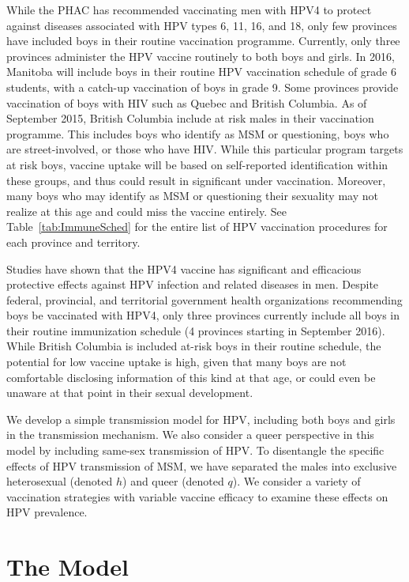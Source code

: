 \documentclass[12pt]{article}
\begin{document}
While the PHAC has recommended vaccinating men with HPV4 to protect against diseases associated with HPV types 6, 11, 16, and 18, only few provinces have included boys in their routine vaccination programme.  Currently, only three provinces administer the HPV vaccine routinely to both boys and girls.  In 2016, Manitoba will include boys in their routine HPV vaccination schedule of grade 6 students, with a catch-up vaccination of boys in grade 9.  Some provinces provide vaccination of boys with HIV such as Quebec and British Columbia.  As of September 2015, British Columbia include at risk males in their vaccination programme.  This includes boys who identify as MSM or questioning, boys who are street-involved, or those who have HIV. While this particular program targets at risk boys, vaccine uptake will be based on self-reported identification within these groups, and thus could result in significant under vaccination.  Moreover, many boys who may identify as MSM or questioning their sexuality may not realize at this age and could miss the vaccine entirely.  See Table~\ref{tab:ImmuneSched} for the entire list of HPV vaccination procedures for each province and territory.  

Studies have shown that the HPV4 vaccine has significant and efficacious protective effects against HPV infection and related diseases in men.  Despite federal, provincial, and territorial government health organizations recommending boys be vaccinated with HPV4, only three provinces currently include all boys in their routine immunization schedule (4 provinces starting in September 2016).  While British Columbia is included at-risk boys in their routine schedule, the potential for low vaccine uptake is high, given that many boys are not comfortable disclosing information of this kind at that age, or could even be unaware at that point in their sexual development.  

We develop a simple transmission model for HPV, including both boys and girls in the transmission mechanism.  We also consider a queer perspective in this model by including same-sex transmission of HPV.  To disentangle the specific effects of HPV transmission of MSM, we have separated the males into exclusive heterosexual (denoted $h$) and queer (denoted $q$).  We consider a variety of vaccination strategies with variable vaccine efficacy to examine these effects on HPV prevalence.  
 

\section*{The Model}
\end{document}
